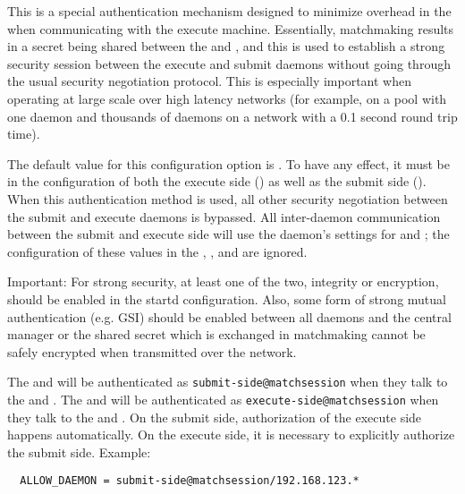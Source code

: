 \begin{description}
\label{param:SecEnableMatchPasswordAuthentication}
\item[\Macro{SEC\_ENABLE\_MATCH\_PASSWORD\_AUTHENTICATION}]
  This is a special authentication mechanism designed to minimize
  overhead in the  when communicating with the execute
  machine.  Essentially, matchmaking results in a secret being shared
  between the  and , and this is used to
  establish a strong security session between the execute and submit
  daemons without going through the usual security negotiation protocol.
  This is especially important when operating at large scale over high
  latency networks (for example, on a pool with one  daemon
  and thousands of  daemons on a network with a 0.1 second 
  round trip time).

  The default value for this configuration option is .  To
  have any effect, it must be  in the configuration of both
  the execute side () as well as the submit side 
  ().  When
  this authentication method is used, all other security negotiation
  between the submit and execute daemons is bypassed.  All inter-daemon
  communication between the submit and execute side will use the
   daemon's settings for  and
  ; the configuration of these values in
  the , , and  are ignored.

  Important: For strong security, at least one of the two, integrity or
  encryption, should be enabled in the startd configuration.  Also, some
  form of strong mutual authentication (e.g. GSI) should be enabled
  between all daemons and the central manager or the shared secret which
  is exchanged in matchmaking cannot be safely encrypted when transmitted
  over the network.

  The  and  will be authenticated as
  \verb|submit-side@matchsession| when they talk to the  and
  .  The  and  will be authenticated as
  \verb|execute-side@matchsession| when they talk to the  and
  .  On the submit side, authorization of the execute side happens
  automatically.  On the execute side, it is necessary to explicitly
  authorize the submit side.  Example:

\begin{verbatim}
  ALLOW_DAEMON = submit-side@matchsession/192.168.123.*
\end{verbatim}


\end{description}
